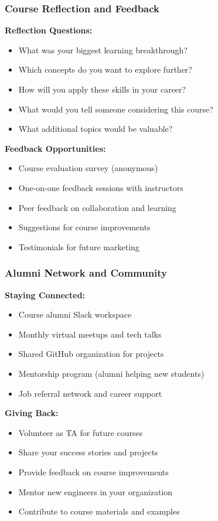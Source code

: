 \documentclass{beamer}
\begin{document}
\begin{frame}
\frametitle{Course Reflection and Feedback}
\textbf{Reflection Questions:}
\begin{itemize}
    \item What was your biggest learning breakthrough?
    \item Which concepts do you want to explore further?
    \item How will you apply these skills in your career?
    \item What would you tell someone considering this course?
    \item What additional topics would be valuable?
\end{itemize}

\vspace{0.5cm}
\textbf{Feedback Opportunities:}
\begin{itemize}
    \item Course evaluation survey (anonymous)
    \item One-on-one feedback sessions with instructors
    \item Peer feedback on collaboration and learning
    \item Suggestions for course improvements
    \item Testimonials for future marketing
\end{itemize}
\end{frame}

\begin{frame}
\frametitle{Alumni Network and Community}
\textbf{Staying Connected:}
\begin{itemize}
    \item Course alumni Slack workspace
    \item Monthly virtual meetups and tech talks
    \item Shared GitHub organization for projects
    \item Mentorship program (alumni helping new students)
    \item Job referral network and career support
\end{itemize}

\vspace{0.5cm}
\textbf{Giving Back:}
\begin{itemize}
    \item Volunteer as TA for future courses
    \item Share your success stories and projects
    \item Provide feedback on course improvements
    \item Mentor new engineers in your organization
    \item Contribute to course materials and examples
\end{itemize}
\end{frame}
\end{document}
